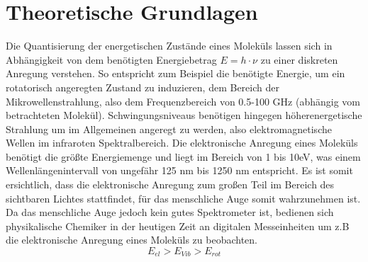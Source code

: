
\setlength\abovedisplayshortskip{20pt}
\setlength\belowdisplayshortskip{20pt}
\setlength\abovedisplayskip{20pt}
\setlength\belowdisplayskip{20pt}


\section{Theoretische Grundlagen \cite{wedler}}
Die Quantisierung der energetischen Zustände eines Moleküls lassen sich in Abhängigkeit von dem benötigten Energiebetrag $E = h \cdot \nu$ zu einer diskreten Anregung verstehen. So entspricht zum Beispiel die benötigte Energie, um ein rotatorisch angeregten Zustand zu induzieren, dem Bereich der Mikrowellenstrahlung, also dem Frequenzbereich von 0.5-100 GHz (abhängig vom betrachteten Molekül). Schwingungsniveaus benötigen hingegen höherenergetische Strahlung um im Allgemeinen angeregt zu werden, also elektromagnetische Wellen im infraroten Spektralbereich. Die elektronische Anregung eines Moleküls benötigt die größte Energiemenge und liegt im Bereich von 1 bis 10eV, was einem Wellenlängenintervall von ungefähr 125 nm bis 1250 nm entspricht. Es ist somit ersichtlich, dass die elektronische Anregung zum großen Teil im Bereich des sichtbaren Lichtes stattfindet, für das menschliche Auge somit wahrzunehmen ist. Da das menschliche Auge jedoch kein gutes Spektrometer ist, bedienen sich physikalische Chemiker in der heutigen Zeit an digitalen Messeinheiten um z.B die elektronische Anregung eines Moleküls zu beobachten.\\
\begin{equation}
E_{el} > E_{Vib}> E_{rot}
\label{eq:EnergieRating}
\end{equation}
\\
